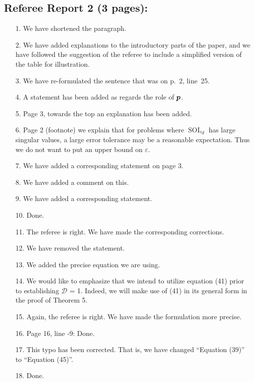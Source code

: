 \documentclass[11pt,a4paper]{article}
\newcommand{\thed}{\mathscr{D}}
\DeclareMathOperator{\SOL}{SOL}
\begin{document}
\subsection*{Referee Report 2 (3 pages):}
\begin{itemize}
    \item[1.] We have shortened the paragraph. 
    \item[2.] We have added explanations to the introductory parts of the paper, and we have followed the suggestion of the referee to include a simplified version of the table for illustration. 
    \item[3.] We have re-formulated the sentence that was on p.~2, line~25. 
    \item[4.] A statement has been added as regards the role of $\boldsymbol{p}$.
    \item[5.] Page 3, towards the top an explanation has been added.
    \item[6.] Page 2 (footnote) we explain that for problems where $\SOL_d$ has large singular values, a large error tolerance may be a reasonable expectation.  Thus we do not want to put an upper bound on $\varepsilon$.
    \item[7.] We have added a corresponding statement on page 3. 
    \item[8.] We have added a comment on this. 
    \item[9.] We have added a corresponding statement. 
    \item[10.] Done. 
    \item[11.] The referee is right. We have made the corresponding corrections. 
    \item[12.] We have removed the statement. 
    \item[13.] We added the precise equation we are using.
    \item[14.] We would like to emphasize that we intend to utilize equation (41) prior to establishing $\thed$ = 1. Indeed, we will make use of (41) in its general form in the proof of Theorem 5. 
    \item[15.] Again, the referee is right. We have made the formulation more precise. 
    \item[16.] Page 16, line -9: Done.
    \item[17.] This typo has been corrected. That is, we have changed ``Equation (39)'' to ``Equation (45)''.
    \item[18.] Done.
\end{itemize}
\end{document}
